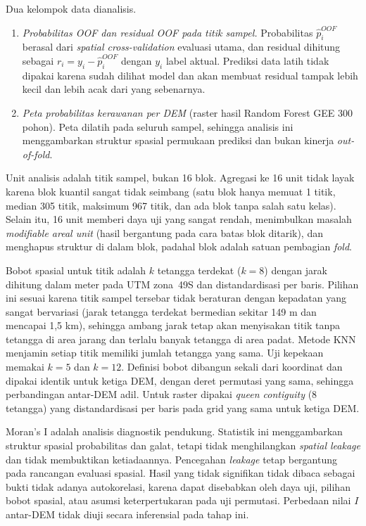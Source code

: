 \documentclass[12pt]{article}
\begin{document}
Dua kelompok data dianalisis.
\begin{enumerate}
\item \textit{Probabilitas OOF dan residual OOF pada titik sampel.}
      Probabilitas $\hat{p}_i^{OOF}$ berasal dari \textit{spatial
      cross-validation} evaluasi utama, dan residual dihitung sebagai
      $r_i=y_i-\hat{p}_i^{OOF}$ dengan $y_i$ label aktual. Prediksi data
      latih tidak dipakai karena sudah dilihat model dan akan membuat
      residual tampak lebih kecil dan lebih acak dari yang sebenarnya.
\item \textit{Peta probabilitas kerawanan per DEM} (raster hasil Random
      Forest GEE 300 pohon). Peta dilatih pada seluruh sampel, sehingga
      analisis ini menggambarkan struktur spasial permukaan prediksi dan
      bukan kinerja \textit{out-of-fold}.
\end{enumerate}

Unit analisis adalah titik sampel, bukan 16 blok. Agregasi ke 16 unit tidak
layak karena blok kuantil sangat tidak seimbang (satu blok hanya memuat 1
titik, median 305 titik, maksimum 967 titik, dan ada blok tanpa salah satu
kelas). Selain itu, 16 unit memberi daya uji yang sangat rendah, menimbulkan
masalah \textit{modifiable areal unit} (hasil bergantung pada cara batas
blok ditarik), dan menghapus struktur di dalam blok, padahal blok adalah
satuan pembagian \textit{fold}.

Bobot spasial untuk titik adalah $k$ tetangga terdekat ($k=8$) dengan jarak
dihitung dalam meter pada UTM zona~49S dan distandardisasi per baris. Pilihan
ini sesuai karena titik sampel tersebar tidak beraturan dengan kepadatan yang
sangat bervariasi (jarak tetangga terdekat bermedian sekitar 149 m dan
mencapai 1,5 km), sehingga ambang jarak tetap akan menyisakan titik tanpa
tetangga di area jarang dan terlalu banyak tetangga di area padat. Metode
KNN menjamin setiap titik memiliki jumlah tetangga yang sama. Uji kepekaan
memakai $k=5$ dan $k=12$. Definisi bobot dibangun sekali dari koordinat dan
dipakai identik untuk ketiga DEM, dengan deret permutasi yang sama, sehingga
perbandingan antar-DEM adil. Untuk raster dipakai \textit{queen contiguity}
(8 tetangga) yang distandardisasi per baris pada grid yang sama untuk ketiga
DEM.

Moran's I adalah analisis diagnostik pendukung. Statistik ini menggambarkan
struktur spasial probabilitas dan galat, tetapi tidak menghilangkan
\textit{spatial leakage} dan tidak membuktikan ketiadaannya. Pencegahan
\textit{leakage} tetap bergantung pada rancangan evaluasi spasial. Hasil yang
tidak signifikan tidak dibaca sebagai bukti tidak adanya autokorelasi, karena
dapat disebabkan oleh daya uji, pilihan bobot spasial, atau asumsi
keterpertukaran pada uji permutasi. Perbedaan nilai $I$ antar-DEM tidak diuji
secara inferensial pada tahap ini.
\end{document}
